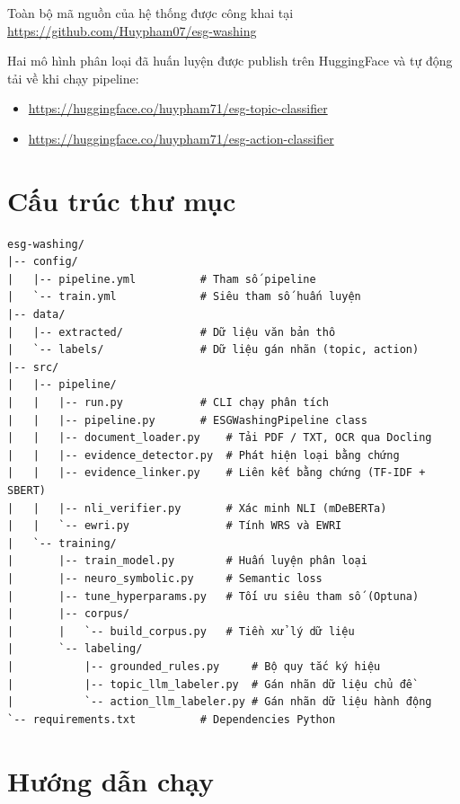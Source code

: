 \label{appendix:source_code}

Toàn bộ mã nguồn của hệ thống được công khai tại \url{https://github.com/Huypham07/esg-washing}

Hai mô hình phân loại đã huấn luyện được publish trên HuggingFace và tự động tải về khi chạy pipeline:

\begin{itemize}
    \item \url{https://huggingface.co/huypham71/esg-topic-classifier}
    \item \url{https://huggingface.co/huypham71/esg-action-classifier}
\end{itemize}

\section*{Cấu trúc thư mục}

\begin{verbatim}
esg-washing/
|-- config/
|   |-- pipeline.yml          # Tham số pipeline
|   `-- train.yml             # Siêu tham số huấn luyện
|-- data/
|   |-- extracted/            # Dữ liệu văn bản thô
|   `-- labels/               # Dữ liệu gán nhãn (topic, action)
|-- src/
|   |-- pipeline/
|   |   |-- run.py            # CLI chạy phân tích
|   |   |-- pipeline.py       # ESGWashingPipeline class
|   |   |-- document_loader.py    # Tải PDF / TXT, OCR qua Docling
|   |   |-- evidence_detector.py  # Phát hiện loại bằng chứng
|   |   |-- evidence_linker.py    # Liên kết bằng chứng (TF-IDF + SBERT)
|   |   |-- nli_verifier.py       # Xác minh NLI (mDeBERTa)
|   |   `-- ewri.py               # Tính WRS và EWRI
|   `-- training/
|       |-- train_model.py        # Huấn luyện phân loại
|       |-- neuro_symbolic.py     # Semantic loss
|       |-- tune_hyperparams.py   # Tối ưu siêu tham số (Optuna)
|       |-- corpus/
|       |   `-- build_corpus.py   # Tiền xử lý dữ liệu
|       `-- labeling/
|           |-- grounded_rules.py     # Bộ quy tắc ký hiệu
|           |-- topic_llm_labeler.py  # Gán nhãn dữ liệu chủ đề
|           `-- action_llm_labeler.py # Gán nhãn dữ liệu hành động
`-- requirements.txt          # Dependencies Python
\end{verbatim}

\section*{Hướng dẫn chạy}

